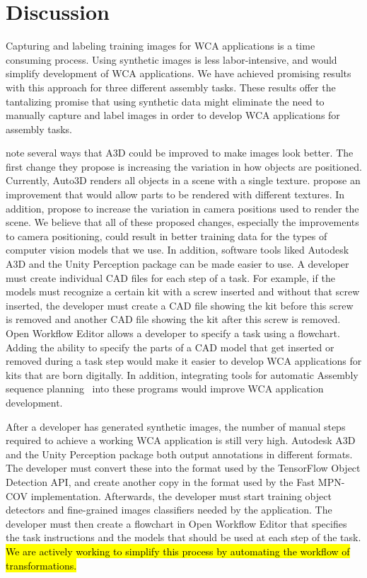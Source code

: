 \section{Discussion}

Capturing and labeling training images for WCA applications is a time
consuming process.  Using synthetic images is less labor-intensive,
and would simplify development of WCA applications.  We have achieved
promising results with this approach for three different assembly tasks.
These results offer the tantalizing promise that
using synthetic data might eliminate the need to manually capture and label
images in order to develop WCA applications for assembly tasks.

\citet{Wang_2022_CVPR} note several ways that A3D could be improved to make
images look better.
The first change they propose is increasing the variation in how objects are
positioned.
Currently, Auto3D renders all objects in a scene with a single texture.
\citet{Wang_2022_CVPR} propose an improvement that would allow parts to be
rendered with different textures.
In addition, \citet{Wang_2022_CVPR} propose to increase the variation in camera
positions used to render the scene.
We believe that all of these proposed changes, especially the improvements to
camera positioning, could result in better training data for the types of
computer vision models that we use.
In addition, software tools liked Autodesk A3D and the Unity Perception package
can be made easier to use.
A developer must create individual CAD files for each step of a task.
For example, if the models must recognize a certain kit with a screw
inserted and without that screw inserted, the developer must create a CAD file
showing the kit before this screw is removed and another CAD file showing the
kit after this screw is removed.
Open Workflow Editor allows a developer to specify a task using a flowchart.
Adding the ability to specify the parts of a CAD model that get inserted or
removed during a task step would make it easier to develop
WCA applications for kits that are born digitally.
In addition, integrating tools for automatic Assembly sequence
planning~\cite{subassembly_identification} into these programs would improve WCA
application development.

After a developer has generated synthetic images, the number of manual steps
required to achieve a working WCA application is still very high.
Autodesk A3D and the Unity Perception package both output annotations in
different formats.
The developer must convert these into the format used by the TensorFlow Object
Detection API, and create another copy in the format used by the Fast MPN-COV
implementation.
Afterwards, the developer must start training object detectors and fine-grained
images classifiers needed by the application.
The developer must then create a flowchart in Open Workflow Editor that
specifies the task instructions and the models that should be used at each step
of the task.
\hl{
  We are actively working to simplify this process by automating the workflow
  of transformations.
}
